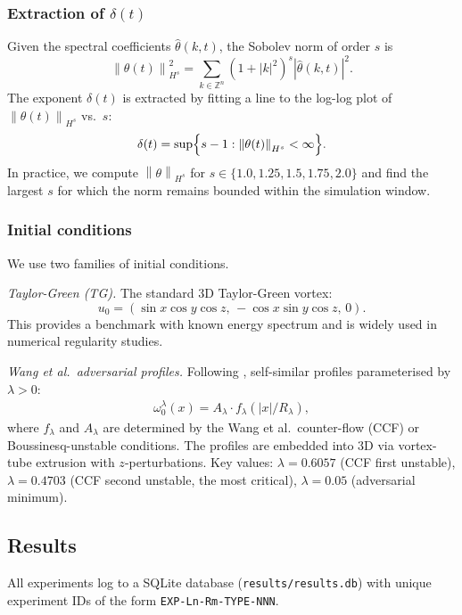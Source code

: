 \documentclass[12pt]{article}
\theoremstyle{plain}
\theoremstyle{definition}
\theoremstyle{remark}
\newcommand{\Z}{\mathbb{Z}}
\newcommand{\norm}[1]{\left\|#1\right\|}
\newcommand{\abs}[1]{\left|#1\right|}
\begin{document}
\subsubsection*{Extraction of $\delta(t)$}

Given the spectral coefficients $\hat\theta(k,t)$, the Sobolev norm of order $s$ is
\[
  \norm{\theta(t)}_{H^s}^2 = \sum_{k\in\Z^n}(1+\abs{k}^2)^s\abs{\hat\theta(k,t)}^2.
\]
The exponent $\delta(t)$ is extracted by fitting a line to the log-log plot of
$\norm{\theta(t)}_{H^s}$ vs.\ $s$:
\begin{equation}\label{eq:delta-extraction}
  \delta(t) = \sup\Bigl\{s - 1 : \norm{\theta(t)}_{H^s} < \infty\Bigr\}.
\end{equation}
In practice, we compute $\norm{\theta}_{H^s}$ for $s\in\{1.0, 1.25, 1.5, 1.75, 2.0\}$
and find the largest $s$ for which the norm remains bounded within
the simulation window.

\subsubsection*{Initial conditions}

We use two families of initial conditions.

\textit{Taylor-Green (TG).}
The standard 3D Taylor-Green vortex:
\[
  u_0 = (\sin x\cos y\cos z,\,-\cos x\sin y\cos z,\,0).
\]
This provides a benchmark with known energy spectrum and is widely used in
numerical regularity studies.

\textit{Wang et al.\ adversarial profiles.}
Following \cite{Wang2025}, self-similar profiles parameterised by $\lambda>0$:
\begin{align*}
  \omega_0^\lambda(x) = A_\lambda \cdot f_\lambda(\abs{x}/R_\lambda),
\end{align*}
where $f_\lambda$ and $A_\lambda$ are determined by the Wang et al.\ counter-flow
(CCF) or Boussinesq-unstable conditions.
The profiles are embedded into 3D via vortex-tube extrusion with $z$-perturbations.
Key values: $\lambda=0.6057$ (CCF first unstable), $\lambda=0.4703$
(CCF second unstable, the most critical), $\lambda=0.05$ (adversarial minimum).

\subsection{Results}

All experiments log to a SQLite database (\texttt{results/results.db})
with unique experiment IDs of the form \texttt{EXP-Ln-Rm-TYPE-NNN}.
\end{document}
